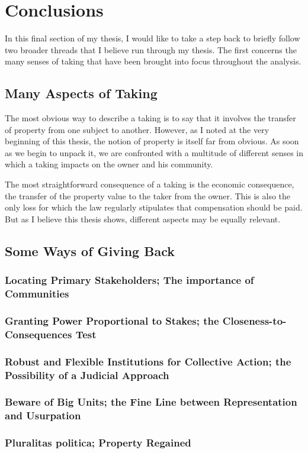 \chapter{Conclusions}

In this final section of my thesis, I would like to take a step back to briefly follow two broader threads that I believe run through my thesis. The first concerns the many senses of taking that have been brought into focus throughout the analysis.

\section{Many Aspects of Taking}

The most obvious way to describe a taking is to say that it involves the transfer of property from one subject to another. However, as I noted at the very beginning of this thesis, the notion of property is itself far from obvious. As soon as we begin to unpack it, we are confronted with a multitude of different senses in which a taking impacts on the owner and his community.

The most straightforward consequence of a taking is the economic consequence, the transfer of the property value to the taker from the owner. This is also the only loss for which the law regularly stipulates that compensation should be paid. But as I believe this thesis shows, different aspects may be equally relevant.

\section{Some Ways of Giving Back}

\subsection{Locating Primary Stakeholders; The importance of Communities}

\subsection{Granting Power Proportional to Stakes; the Closeness-to-Consequences Test}

\subsection{Robust and Flexible Institutions for Collective Action; the Possibility of a Judicial Approach}

\subsection{Beware of Big Units; the Fine Line between Representation and Usurpation}

\subsection{Pluralitas politica; Property Regained}
